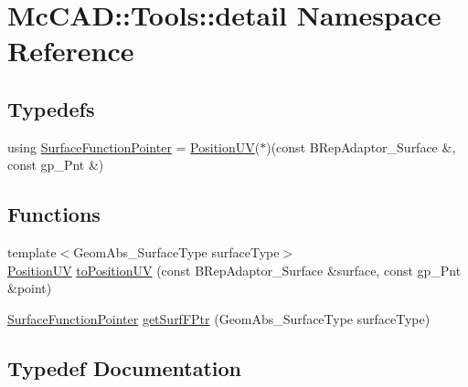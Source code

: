 \hypertarget{namespaceMcCAD_1_1Tools_1_1detail}{}\section{Mc\+C\+AD\+:\+:Tools\+:\+:detail Namespace Reference}
\label{namespaceMcCAD_1_1Tools_1_1detail}
\subsection*{Typedefs}
\begin{DoxyCompactItemize}
\item 
using \hyperlink{namespaceMcCAD_1_1Tools_1_1detail_a1e45a87ac7426f4a0d25bdecb437dcce}{Surface\+Function\+Pointer} = \hyperlink{structMcCAD_1_1Tools_1_1PositionUV}{Position\+UV}($\ast$)(const B\+Rep\+Adaptor\+\_\+\+Surface \&, const gp\+\_\+\+Pnt \&)
\end{DoxyCompactItemize}
\subsection*{Functions}
\begin{DoxyCompactItemize}
\item 
{\footnotesize template$<$Geom\+Abs\+\_\+\+Surface\+Type surface\+Type$>$ }\\\hyperlink{structMcCAD_1_1Tools_1_1PositionUV}{Position\+UV} \hyperlink{namespaceMcCAD_1_1Tools_1_1detail_a8d54cda4879b503acfb373d66202dc3b}{to\+Position\+UV} (const B\+Rep\+Adaptor\+\_\+\+Surface \&surface, const gp\+\_\+\+Pnt \&point)
\item 
\hyperlink{namespaceMcCAD_1_1Tools_1_1detail_a1e45a87ac7426f4a0d25bdecb437dcce}{Surface\+Function\+Pointer} \hyperlink{namespaceMcCAD_1_1Tools_1_1detail_a119ac0e14da83e25dcc976a37b4e7f3f}{get\+Surf\+F\+Ptr} (Geom\+Abs\+\_\+\+Surface\+Type surface\+Type)
\end{DoxyCompactItemize}


\subsection{Typedef Documentation}
\mbox{\label{namespaceMcCAD_1_1Tools_1_1detail_a1e45a87ac7426f4a0d25bdecb437dcce}} 
